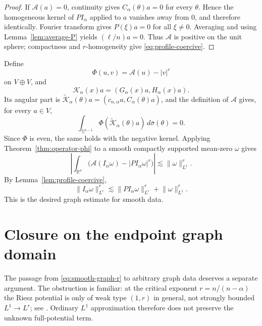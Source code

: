 \documentclass[11pt]{amsart}
\numberwithin{equation}{section}
\theoremstyle{definition}
\theoremstyle{remark}
\newcommand{\R}{\mathbb R}
\newcommand{\Sph}{\mathbb S}
\newcommand{\norm}[1]{\lVert #1\rVert}
\begin{document}
\begin{proof}
If $\mathcal A(a)=0$, continuity gives $C_\alpha(\theta)a=0$ for every
$\theta$.  Hence the homogeneous kernel of $P I_\alpha$ applied to $a$
vanishes away from $0$, and therefore identically.  Fourier transform gives
$P(\xi)a=0$ for all $\xi\ne0$.  Averaging and using
Lemma~\ref{lem:average-P} yields $(\ell/n)a=0$.  Thus $\mathcal A$ is positive
on the unit sphere; compactness and $r$-homogeneity give
\eqref{eq:profile-coercive}.
\end{proof}

Define
\begin{equation}\label{eq:Phi-profile}
 \Phi(u,v)=\mathcal A(u)-|v|^r
\end{equation}
on $V\oplus V$, and
\begin{equation}\label{eq:paired-kernel}
 \mathcal K_\alpha(x)a=(G_\alpha(x)a,H_\alpha(x)a).
\end{equation}
Its angular part is
$\widetilde{\mathcal K}_\alpha(\theta)a
=(c_{n,\alpha}a,C_\alpha(\theta)a)$, and the definition of
$\mathcal A$ gives, for every $a\in V$,
\[
 \int_{\Sph^{n-1}}
 \Phi(\widetilde{\mathcal K}_\alpha(\theta)a)\,d\bar\sigma(\theta)=0.
\]
Since $\Phi$ is even, the same holds with the negative kernel.  Applying
Theorem~\ref{thm:operator-phi} to a smooth compactly supported
mean-zero $\omega$ gives
\begin{equation}\label{eq:profile-integral}
 \left|\int_{\R^n}
 \bigl(\mathcal A(I_\alpha\omega)-|P I_\alpha\omega|^r\bigr)\right|
 \lesssim \norm\omega_{L^1}^r.
\end{equation}
By Lemma~\ref{lem:profile-coercive},
\begin{equation}\label{eq:smooth-graph-r}
 \norm{I_\alpha\omega}_{L^r}^r
 \lesssim
 \norm{P I_\alpha\omega}_{L^r}^r+\norm\omega_{L^1}^r.
\end{equation}
This is the desired graph estimate for smooth data.

\section{Closure on the endpoint graph domain}\label{sec:closure}

The passage from \eqref{eq:smooth-graph-r} to arbitrary graph data deserves a
separate argument.  The obstruction is familiar: at the critical exponent
$r=n/(n-\alpha)$ the Riesz potential is only of weak type $(1,r)$ in general,
not strongly bounded $L^1\to L^r$; see \cite[Chapter~V]{Stein70}.  Ordinary
$L^1$ approximation therefore does not preserve the unknown full-potential
term.
\end{document}
